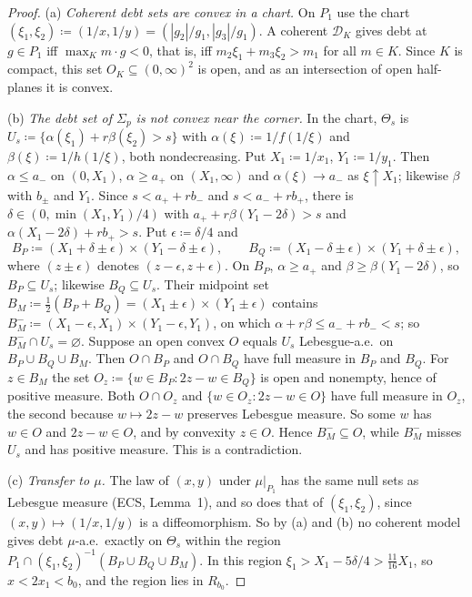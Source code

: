 \documentclass[11pt]{article}
\theoremstyle{definition}\newtheorem{definition}[theorem]{Definition}
\theoremstyle{remark}\newtheorem{remark}[theorem]{Remark}
\newcommand{\Dscr}{\mathcal D}
\begin{document}
\begin{proof}
(a) \emph{Coherent debt sets are convex in a chart.} On $P_1$ use the chart
$(\xi_1,\xi_2)\coloneqq(1/x,1/y)=(|g_2|/g_1,|g_3|/g_1)$. A coherent
$\Dscr_K$ gives debt at $g\in P_1$ iff $\max_Km\cdot g<0$, that is, iff
$m_2\xi_1+m_3\xi_2>m_1$ for all $m\in K$. Since $K$ is compact, this set
$O_K\subseteq(0,\infty)^2$ is open, and as an intersection of open half-planes
it is convex.

(b) \emph{The debt set of $\Sigma_p$ is not convex near the corner.} In the
chart, $\Theta_s$ is $U_s\coloneqq\{\alpha(\xi_1)+r\beta(\xi_2)>s\}$ with
$\alpha(\xi)\coloneqq1/f(1/\xi)$ and $\beta(\xi)\coloneqq1/h(1/\xi)$, both
nondecreasing. Put $X_1\coloneqq1/x_1$, $Y_1\coloneqq1/y_1$. Then
$\alpha\le a_-$ on $(0,X_1)$, $\alpha\ge a_+$ on $(X_1,\infty)$ and
$\alpha(\xi)\to a_-$ as $\xi\uparrow X_1$; likewise $\beta$ with $b_\pm$ and
$Y_1$. Since $s<a_++rb_-$ and $s<a_-+rb_+$, there is
$\delta\in(0,\min(X_1,Y_1)/4)$ with $a_++r\beta(Y_1-2\delta)>s$ and
$\alpha(X_1-2\delta)+rb_+>s$. Put $\epsilon\coloneqq\delta/4$ and
\[
 B_P\coloneqq(X_1+\delta\pm\epsilon)\times(Y_1-\delta\pm\epsilon),\qquad
 B_Q\coloneqq(X_1-\delta\pm\epsilon)\times(Y_1+\delta\pm\epsilon),
\]
where $(z\pm\epsilon)$ denotes $(z-\epsilon,z+\epsilon)$. On $B_P$,
$\alpha\ge a_+$ and $\beta\ge\beta(Y_1-2\delta)$, so $B_P\subseteq U_s$;
likewise $B_Q\subseteq U_s$. Their midpoint set
$B_M\coloneqq\frac12(B_P+B_Q)=(X_1\pm\epsilon)\times(Y_1\pm\epsilon)$ contains
$B_M^-\coloneqq(X_1-\epsilon,X_1)\times(Y_1-\epsilon,Y_1)$, on which
$\alpha+r\beta\le a_-+rb_-<s$; so $B_M^-\cap U_s=\varnothing$. Suppose an open
convex $O$ equals $U_s$ Lebesgue-a.e.\ on $B_P\cup B_Q\cup B_M$. Then $O\cap
B_P$ and $O\cap B_Q$ have full measure in $B_P$ and $B_Q$. For $z\in B_M$ the
set $O_z\coloneqq\{w\in B_P:2z-w\in B_Q\}$ is open and nonempty, hence of
positive measure. Both $O\cap O_z$ and $\{w\in O_z:2z-w\in O\}$ have full
measure in $O_z$, the second because $w\mapsto2z-w$ preserves Lebesgue
measure. So some $w$ has $w\in O$ and $2z-w\in O$, and by convexity $z\in O$.
Hence $B_M^-\subseteq O$, while $B_M^-$ misses $U_s$ and has positive
measure. This is a contradiction.

(c) \emph{Transfer to $\mu$.} The law of $(x,y)$ under $\mu|_{P_1}$ has the
same null sets as Lebesgue measure (ECS, Lemma~1), and so does that of
$(\xi_1,\xi_2)$, since $(x,y)\mapsto(1/x,1/y)$ is a diffeomorphism. So by
(a) and (b) no coherent model gives debt $\mu$-a.e.\ exactly on $\Theta_s$
within the region $P_1\cap(\xi_1,\xi_2)^{-1}(B_P\cup B_Q\cup B_M)$. In this
region $\xi_1>X_1-5\delta/4>\frac{11}{16}X_1$, so $x<2x_1<b_0$, and the region
lies in $R_{b_0}$.


\end{proof}
\end{document}
